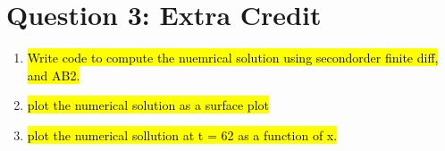 \documentclass{article}
\begin{document}
\section*{Question 3: Extra Credit}

\begin{enumerate}[label=\alph*)]

    \item \hl{Write code to compute the nuemrical solution using secondorder finite
    diff, and AB2.} 

    \item \hl{plot the numerical solution as a surface plot}

    \item \hl{plot the numerical sollution at t = 62 as a function of x.}

\end{enumerate}
\end{document}
